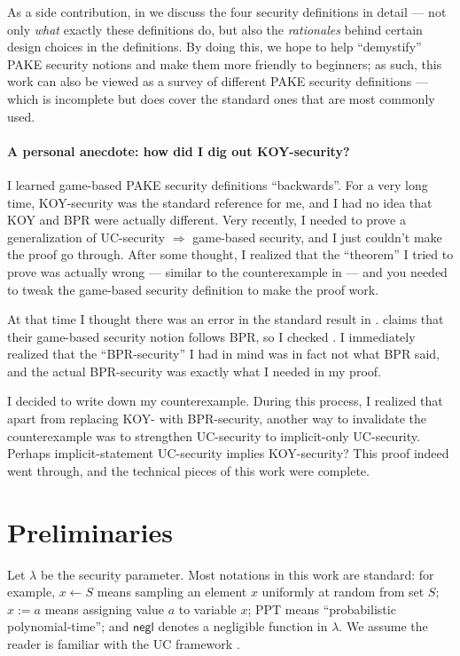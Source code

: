 \documentclass{article}
\newcommand{\negl}{\mathsf{negl}}
\begin{document}
As a side contribution, in  we discuss the four security definitions in detail --- not only \emph{what} exactly these definitions do, but also the \emph{rationales} behind certain design choices in the definitions. By doing this, we hope to help ``demystify'' PAKE security notions and make them more friendly to beginners; as such, this work can also be viewed as a survey of different PAKE security definitions --- which is incomplete but does cover the standard ones that are most commonly used.

\paragraph{A personal anecdote: how did I dig out KOY-security?}
I learned game-based PAKE security definitions ``backwards''. For a very long time, KOY-security was the standard reference for me, and I had no idea that KOY and BPR were actually different. Very recently, I needed to prove a generalization of UC-security $\Rightarrow$ game-based security, and I just couldn't make the proof go through. After some thought, I realized that the ``theorem'' I tried to prove was actually wrong --- similar to the counterexample in  --- and you needed to tweak the game-based security definition to make the proof work.

At that time I thought there was an error in the standard result in \cite{EC:CHKLM05}. \cite{EC:CHKLM05} claims that their game-based security notion follows BPR, so I checked \cite{EC:BelPoiRog00}. I immediately realized that the ``BPR-security'' I had in mind was in fact not what BPR said, and the actual BPR-security was exactly what I needed in my proof.

I decided to write down my counterexample. During this process, I realized that apart from replacing KOY- with BPR-security, another way to invalidate the counterexample was to strengthen UC-security to implicit-only UC-security. Perhaps implicit-statement UC-security implies KOY-security? This proof indeed went through, and the technical pieces of this work were complete.

\section{Preliminaries}
\label{sec:prelims}
Let $\lambda$ be the security parameter. Most notations in this work are standard: for example, $x \gets S$ means sampling an element $x$ uniformly at random from set $S$; $x := a$ means assigning value $a$ to variable $x$; PPT means ``probabilistic polynomial-time''; and $\negl$ denotes a negligible function in $\lambda$. We assume the reader is familiar with the UC framework \cite{FOCS:Canetti01}.
\end{document}
